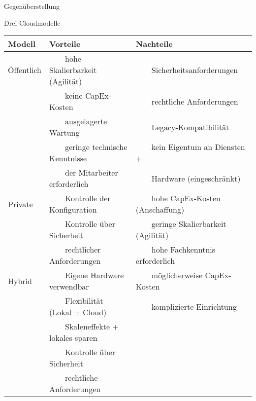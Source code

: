 \documentclass{scrartcl}
\newenvironment{flashcard}[2][]{%
    #1
    \vfill
    \centerline{\Large{#2}}
    \vfill
\newpage
}
{\newpage}
\newcommand{\tabitem}{~~\llap{\textbullet}~~}
\newcommand{\tabitemindent}{~~~~}
\begin{document}
    \begin{flashcard}[Gegenüberstellung]{Drei Cloudmodelle}
            \begin{tabular}{l|ll}
                Modell     & Vorteile                                     & Nachteile                                  \\
                \hline
                Öffentlich & \tabitem hohe Skalierbarkeit (Agilität)      & \tabitem Sicherheitsanforderungen          \\
                           & \tabitem keine CapEx-Kosten                  & \tabitem rechtliche Anforderungen          \\
                           & \tabitem ausgelagerte Wartung                & \tabitem Legacy-Kompatibilität             \\
                           & \tabitem geringe technische Kenntnisse       & \tabitem kein Eigentum an Diensten +       \\
                           & \tabitemindent der Mitarbeiter erforderlich  & \tabitemindent Hardware (eingeschränkt)    \\
                [.5\normalbaselineskip]
                Private    & \tabitem Kontrolle der Konfiguration         & \tabitem hohe CapEx-Kosten (Anschaffung)   \\
                           & \tabitem Kontrolle über Sicherheit           & \tabitem geringe Skalierbarkeit (Agilität) \\
                           & \tabitem rechtlicher Anforderungen           & \tabitem hohe Fachkenntnis erforderlich    \\
                [.5\normalbaselineskip]
                Hybrid     & \tabitem Eigene Hardware verwendbar          & \tabitem möglicherweise CapEx-Kosten       \\
                           & \tabitem Flexibilität (Lokal + Cloud)        & \tabitem komplizierte Einrichtung          \\
                           & \tabitem Skaleneffekte + lokales sparen      &                                            \\
                           & \tabitem Kontrolle über Sicherheit           &                                            \\
                           & \tabitem rechtliche Anforderungen            &                                            \\
            \end{tabular}
    \end{flashcard}
\end{document}
